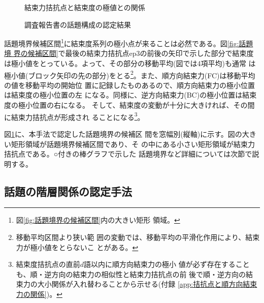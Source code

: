\begin{figure}[htbp]
  \begin{center}
    \leavevmode

    \caption{結束力拮抗点と結束度の極値との関係}
    \label{fig:話題境界の候補区間}
  \end{center}
  \begin{center}
    \leavevmode
    \caption{調査報告書の話題構成の認定結果}
    \label{fig:余弦測度による話題境界}
  \end{center}
\end{figure}

話題境界候補区間\footnote{図\ref{fig:話題境界の候補区間}内の大きい矩形
  領域。}に結束度系列の極小点が来ることは必然である。図\ref{fig:話題境
  界の候補区間}で最後の結束力拮抗点ep3の前後の矢印で示した部分で結束度
は極小値をとっている。よって、その部分の移動平均(図では4項平均)も通常
は極小値(ブロック矢印の先の部分)をとる\footnote{移動平均区間より狭い範
  囲の変動では、移動平均の平滑化作用により、結束力が極小値をとらないこ
  とがある。}。また、順方向結束力(FC)は移動平均の値を移動平均の開始位
置に記録したものあるので、順方向結束力の極小位置は結束度の極小位置の左
になる。同様に、逆方向結束力(BC)の極小位置は結束度の極小位置の右になる。
そして、結束度の変動が十分に大きければ、その間に結束力拮抗点が形成され
ることになる\footnote{結束度拮抗点の直前$d$語以内に順方向結束力の極小
  値が必ず存在することも、順・逆方向の結束力の相似性と結束力拮抗点の前
  後で順・逆方向の結束力の大小関係が入れ替わることから示せる(付録
  \ref{app:拮抗点と順方向結束力の関係})。}。

図\ref{fig:余弦測度による話題境界}に、本手法で認定した話題境界の候補区
間を窓幅別(縦軸)に示す。図の大きい矩形領域が話題境界候補区間であり、そ
の中にある小さい矩形領域が結束力拮抗点である。○付きの棒グラフで示した
話題境界など詳細については次節で説明する。

\subsection{話題の階層関係の認定手法}
\label{sect:話題の階層関係の認定手法}

